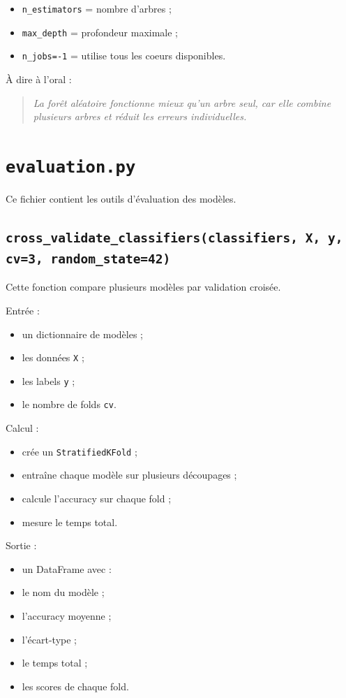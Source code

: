 \documentclass[11pt,a4paper]{article}
\begin{document}
\begin{itemize}
\item \texttt{n\_estimators} = nombre d'arbres ;
\item \texttt{max\_depth} = profondeur maximale ;
\item \texttt{n\_jobs=-1} = utilise tous les coeurs disponibles.
\end{itemize}

À dire à l'oral :

\begin{quote}
\itshape La forêt aléatoire fonctionne mieux qu'un arbre seul, car elle combine plusieurs arbres et réduit les erreurs individuelles.
\end{quote}

\section{\texttt{evaluation.py}}

Ce fichier contient les outils d'évaluation des modèles.

\subsection{\texttt{cross\_validate\_classifiers(classifiers, X, y, cv=3, random\_state=42)}}

Cette fonction compare plusieurs modèles par validation croisée.

Entrée :

\begin{itemize}
\item un dictionnaire de modèles ;
\item les données \texttt{X} ;
\item les labels \texttt{y} ;
\item le nombre de folds \texttt{cv}.
\end{itemize}

Calcul :

\begin{itemize}
\item crée un \texttt{StratifiedKFold} ;
\item entraîne chaque modèle sur plusieurs découpages ;
\item calcule l'accuracy sur chaque fold ;
\item mesure le temps total.
\end{itemize}

Sortie :

\begin{itemize}
\item un DataFrame avec :
\item le nom du modèle ;
\item l'accuracy moyenne ;
\item l'écart-type ;
\item le temps total ;
\item les scores de chaque fold.
\end{itemize}
\end{document}
